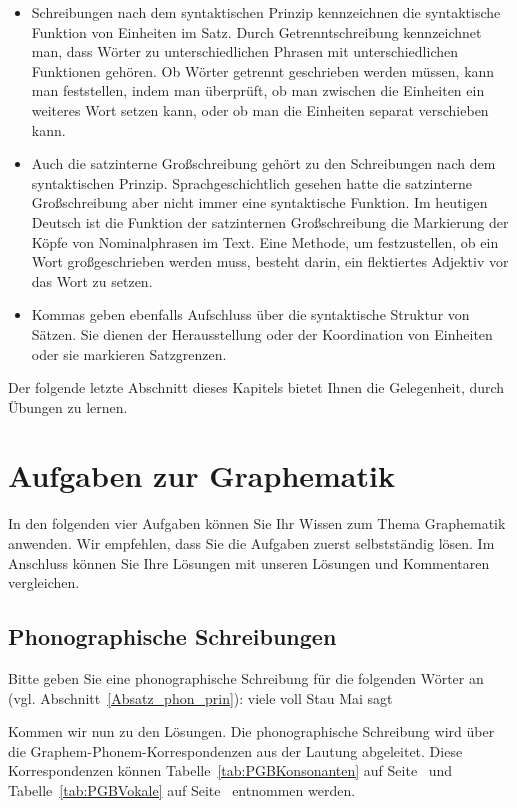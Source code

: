 \begin{itemize}
\item Schreibungen nach dem syntaktischen Prinzip kennzeichnen die syntaktische Funktion von Einheiten im Satz. Durch Getrenntschreibung kennzeichnet man, dass Wörter zu unterschiedlichen Phrasen mit unterschiedlichen Funktionen gehören. Ob Wörter getrennt geschrieben werden müssen, kann man feststellen, indem man überprüft, ob man zwischen die Einheiten ein weiteres Wort setzen kann, oder ob man die Einheiten separat verschieben kann.

\item Auch die satzinterne Großschreibung gehört zu den Schreibungen nach dem syntaktischen Prinzip. Sprachgeschichtlich gesehen hatte die satzinterne Großschreibung aber nicht immer eine syntaktische Funktion. Im heutigen Deutsch ist die Funktion der satzinternen Großschreibung die Markierung der Köpfe von Nominalphrasen im Text. Eine Methode, um festzustellen, ob ein Wort großgeschrieben werden muss, besteht darin, ein flektiertes Adjektiv vor das Wort zu setzen.

\item Kommas geben ebenfalls Aufschluss über die syntaktische Struktur von Sätzen. Sie dienen der Herausstellung oder der Koordination von Einheiten oder sie markieren Satzgrenzen. 


\end{itemize}

Der folgende letzte Abschnitt dieses Kapitels bietet Ihnen die Gelegenheit, durch Übungen zu lernen.

\section{Aufgaben zur Graphematik}

In den folgenden vier Aufgaben können Sie Ihr Wissen zum Thema Graphematik anwenden. Wir empfehlen, dass Sie die Aufgaben zuerst selbstständig lösen. Im Anschluss können Sie Ihre Lösungen mit unseren Lösungen und Kommentaren vergleichen.

\subsection{Phonographische Schreibungen}

Bitte geben Sie eine phonographische Schreibung für die folgenden Wörter  an (vgl. Abschnitt~\ref{Absatz_phon_prin}):
\ea
\ea viele
\ex voll
\ex Stau
\ex Mai
\ex sagt
\z
\z



Kommen wir nun zu den Lösungen. Die phonographische Schreibung wird über die Graphem-Phonem-Korrespondenzen aus der Lautung abgeleitet. Diese Korrespondenzen können Tabelle~\ref{tab:PGBKonsonanten} auf Seite~\pageref{tab:PGBKonsonanten} und Tabelle~\ref{tab:PGBVokale} auf Seite~\pageref{tab:PGBVokale} entnommen werden.

